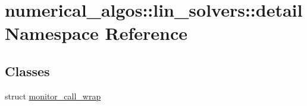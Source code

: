 \hypertarget{namespacenumerical__algos_1_1lin__solvers_1_1detail}{\section{numerical\-\_\-algos\-:\-:lin\-\_\-solvers\-:\-:detail Namespace Reference}
\label{namespacenumerical__algos_1_1lin__solvers_1_1detail}
}
\subsection*{Classes}
\begin{DoxyCompactItemize}
\item 
struct \hyperlink{structnumerical__algos_1_1lin__solvers_1_1detail_1_1monitor__call__wrap}{monitor\-\_\-call\-\_\-wrap}
\end{DoxyCompactItemize}
